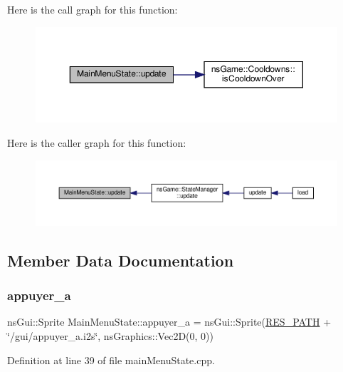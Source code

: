Here is the call graph for this function\+:\nopagebreak
\begin{figure}[H]
\begin{center}
\leavevmode
\includegraphics[width=350pt]{class_main_menu_state_a7846cc7f1bd9b1fc40d77cc8f7644e03_cgraph}
\end{center}
\end{figure}
Here is the caller graph for this function\+:\nopagebreak
\begin{figure}[H]
\begin{center}
\leavevmode
\includegraphics[width=350pt]{class_main_menu_state_a7846cc7f1bd9b1fc40d77cc8f7644e03_icgraph}
\end{center}
\end{figure}


\subsection{Member Data Documentation}
\mbox{\label{class_main_menu_state_ac2034a62c91d9b96ac70d7ed68a6bb0c}} 
\subsubsection{\texorpdfstring{appuyer\+\_\+a}{appuyer\_a}}
{\footnotesize\ttfamily ns\+Gui\+::\+Sprite Main\+Menu\+State\+::appuyer\+\_\+a = ns\+Gui\+::\+Sprite(\hyperlink{definitions_8h_a793644bd88146828177a2a4f57e3bf01}{R\+E\+S\+\_\+\+P\+A\+TH} + \char`\"{}/gui/appuyer\+\_\+a.\+i2s\char`\"{}, ns\+Graphics\+::\+Vec2D(0, 0))}



Definition at line 39 of file main\+Menu\+State.\+cpp.

